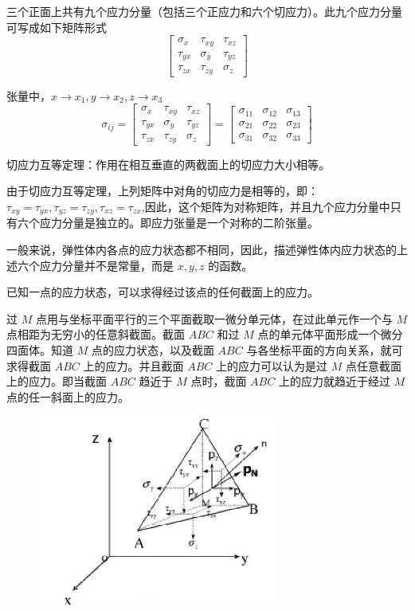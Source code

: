 \documentclass[12pt,a4paper]{article}
\begin{document}
三个正面上共有九个应力分量（包括三个正应力和六个切应力）。此九个应力分量可写成如下矩阵形式
$$
\begin{bmatrix}
\sigma _x & \tau_{xy} & \tau_{xz} \\
\tau_{yx} & \sigma _y & \tau_{yz} \\
\tau_{zx} & \tau_{zy} & \sigma _z
\end{bmatrix}
$$

张量中，$x \to x_1 , y \to x_2 , z \to x_3$
$$
\sigma _{ij} =
\begin{bmatrix}
\sigma _x & \tau_{xy} & \tau_{xz} \\
\tau_{yx} & \sigma _y & \tau_{yz} \\
\tau_{zx} & \tau_{zy} & \sigma _z
\end{bmatrix}=
\begin{bmatrix}
\sigma _{11} & \sigma_{12} & \sigma_{13} \\
\sigma_{21} & \sigma _{22} & \sigma_{23} \\
\sigma_{31} & \sigma_{32} & \sigma_{33}
\end{bmatrix}
$$

切应力互等定理：作用在相互垂直的两截面上的切应力大小相等。

由于切应力互等定理，上列矩阵中对角的切应力是相等的，即：$\tau_{xy}=\tau_{yx}, \tau_{yz}=\tau_{zy}, \tau_{xz}=\tau_{zx}$,因此，这个矩阵为对称矩阵，并且九个应力分量中只有六个应力分量是独立的。即应力张量是一个对称的二阶张量。

一般来说，弹性体内各点的应力状态都不相同，因此，描述弹性体内应力状态的上述六个应力分量并不是常量，而是 $x,y,z$ 的函数。

已知一点的应力状态，可以求得经过该点的任何截面上的应力。

过 $M$ 点用与坐标平面平行的三个平面截取一微分单元体，在过此单元作一个与 $M$ 点相距为无穷小的任意斜截面。截面 $ABC$ 和过 $M$ 点的单元体平面形成一个微分四面体。知道 $M$ 点的应力状态，以及截面 $ABC$ 与各坐标平面的方向关系，就可求得截面 $ABC$ 上的应力。并且截面 $ABC$ 上的应力可以认为是过 $M$ 点任意截面上的应力。即当截面 $ABC$ 趋近于 $M$ 点时，截面 $ABC$ 上的应力就趋近于经过 $M$ 点的任一斜面上的应力。

\begin{figure}[H]
\centering
\includegraphics[scale=0.5]{./figures/7.png}
\caption{}
\end{figure}
\end{document}
